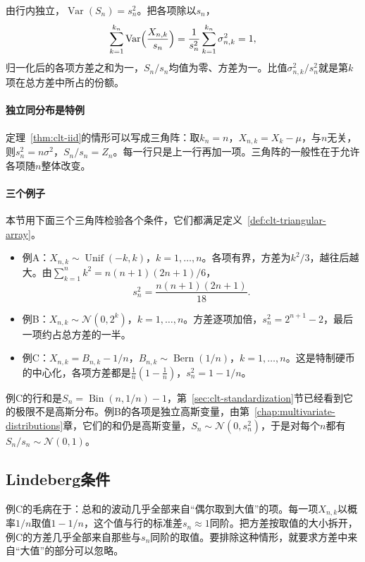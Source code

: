 由行内独立，$\operatorname{Var}(S_n)=s_n^2$。把各项除以$s_n$，
\[
 \sum_{k=1}^{k_n}\operatorname{Var}\Bigl(\frac{X_{n,k}}{s_n}\Bigr)=\frac{1}{s_n^2}\sum_{k=1}^{k_n}\sigma_{n,k}^2=1 ,
\]
归一化后的各项方差之和为一，$S_n/s_n$均值为零、方差为一。比值$\sigma_{n,k}^2/s_n^2$就是第$k$项在总方差中所占的份额。

\paragraph{独立同分布是特例}
定理~\ref{thm:clt-iid}的情形可以写成三角阵：取$k_n=n$，$X_{n,k}=X_k-\mu$，与$n$无关，则$s_n^2=n\sigma^2$，$S_n/s_n=Z_n$。每一行只是上一行再加一项。三角阵的一般性在于允许各项随$n$整体改变。

\paragraph{三个例子}
本节用下面三个三角阵检验各个条件，它们都满足定义~\ref{def:clt-triangular-array}。
\begin{itemize}
 \item 例A：$X_{n,k}\sim\operatorname{Unif}(-k,k)$，$k=1,\dots,n$。各项有界，方差为$k^2/3$，越往后越大。由$\sum_{k=1}^{n}k^2=n(n+1)(2n+1)/6$，
 \[
  s_n^2=\frac{n(n+1)(2n+1)}{18} .
 \]
 \item 例B：$X_{n,k}\sim\mathcal{N}(0,2^{k})$，$k=1,\dots,n$。方差逐项加倍，$s_n^2=2^{n+1}-2$，最后一项约占总方差的一半。
 \item 例C：$X_{n,k}=B_{n,k}-1/n$，$B_{n,k}\sim\operatorname{Bern}(1/n)$，$k=1,\dots,n$。这是特制硬币的中心化，各项方差都是$\frac1n(1-\frac1n)$，$s_n^2=1-1/n$。
\end{itemize}
例C的行和是$S_n=\operatorname{Bin}(n,1/n)-1$，第~\ref{sec:clt-standardization}节已经看到它的极限不是高斯分布。例B的各项是独立高斯变量，由第~\ref{chap:multivariate-distributions}章，它们的和仍是高斯变量，$S_n\sim\mathcal{N}(0,s_n^2)$，于是对每个$n$都有$S_n/s_n\sim\mathcal{N}(0,1)$。

\subsection{Lindeberg条件}
\label{sec:clt-lindeberg}

例C的毛病在于：总和的波动几乎全部来自“偶尔取到大值”的项。每一项$X_{n,k}$以概率$1/n$取值$1-1/n$，这个值与行的标准差$s_n\approx1$同阶。把方差按取值的大小拆开，例C的方差几乎全部来自那些与$s_n$同阶的取值。要排除这种情形，就要求方差中来自“大值”的部分可以忽略。


